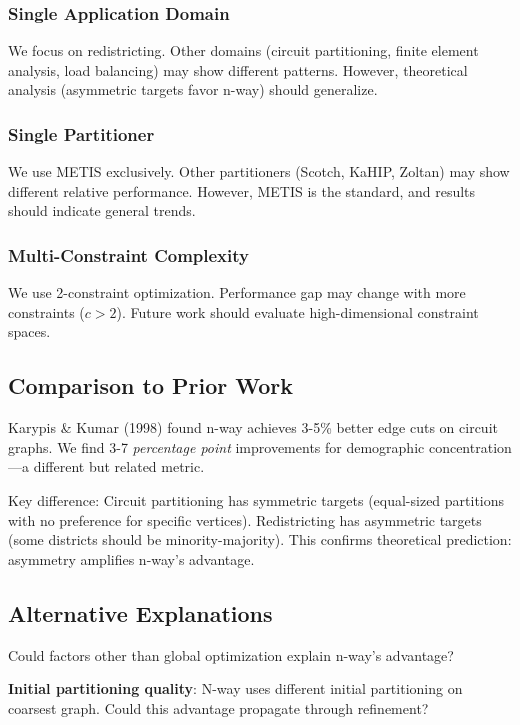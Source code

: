 \subsubsection{Single Application Domain}

We focus on redistricting. Other domains (circuit partitioning, finite element analysis, load balancing) may show different patterns. However, theoretical analysis (asymmetric targets favor n-way) should generalize.

\subsubsection{Single Partitioner}

We use METIS exclusively. Other partitioners (Scotch, KaHIP, Zoltan) may show different relative performance. However, METIS is the standard, and results should indicate general trends.

\subsubsection{Multi-Constraint Complexity}

We use 2-constraint optimization. Performance gap may change with more constraints ($c > 2$). Future work should evaluate high-dimensional constraint spaces.

\subsection{Comparison to Prior Work}

Karypis \& Kumar (1998) \citep{karypis1998} found n-way achieves 3-5\% better edge cuts on circuit graphs. We find 3-7 \textit{percentage point} improvements for demographic concentration—a different but related metric.

Key difference: Circuit partitioning has symmetric targets (equal-sized partitions with no preference for specific vertices). Redistricting has asymmetric targets (some districts should be minority-majority). This confirms theoretical prediction: asymmetry amplifies n-way's advantage.

\subsection{Alternative Explanations}

Could factors other than global optimization explain n-way's advantage?

\textbf{Initial partitioning quality}: N-way uses different initial partitioning on coarsest graph. Could this advantage propagate through refinement?

